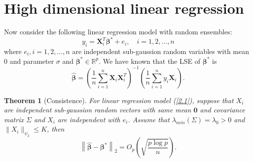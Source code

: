 \documentclass[12pt]{article}
\numberwithin{equation}{section}
\newtheorem{theorem}{Theorem}[section]
\begin{document}
\section{High dimensional linear regression}
Now consider the following linear regression model with random ensembles:
\begin{equation}\label{2.1}
y_i=\boldsymbol{X}_i^T\boldsymbol{\beta}^{*}+e_i,\quad i=1,2,...,n
\end{equation}
where $e_i,i=1,2,...,n$ are independent sub-gaussion random variables with mean 0 and parameter $\sigma$ and $\boldsymbol{\beta}^{*}\in \mathbb{R}^p$. We have known that the LSE of $\boldsymbol{\beta}^{*}$ is 
\begin{equation}
\boldsymbol{\widehat{\beta}}=\left(\frac{1}{n}\sum_{i=1}^{n}\boldsymbol{X}_i\boldsymbol{X}_i^T\right)^{-1}\left(\frac{1}{n}\sum_{i=1}^ny_i\boldsymbol{X}_i\right).
\end{equation}
\begin{theorem}[Consistence]\label{theorem2.1}
	For linear regression model (\ref{2.1}), suppose that $X_i$ are independent sub-gaussion random vectors with same mean $\boldsymbol{0}$ and covariance matrix $\Sigma$ and $X_i$ are independent with $e_i$. Assume that $\lambda_{min}(\Sigma)=\lambda_0>0$ and $\|X_i\|_{\psi_{2}}\leq K$, then
	\begin{equation}
	\left\|\boldsymbol{\widehat{\beta}}-\boldsymbol{\beta}^{*}\right\|_2=O_p\left(\sqrt{\frac{p\log p}{n}}\right).
	\end{equation}
\end{theorem}
\end{document}
